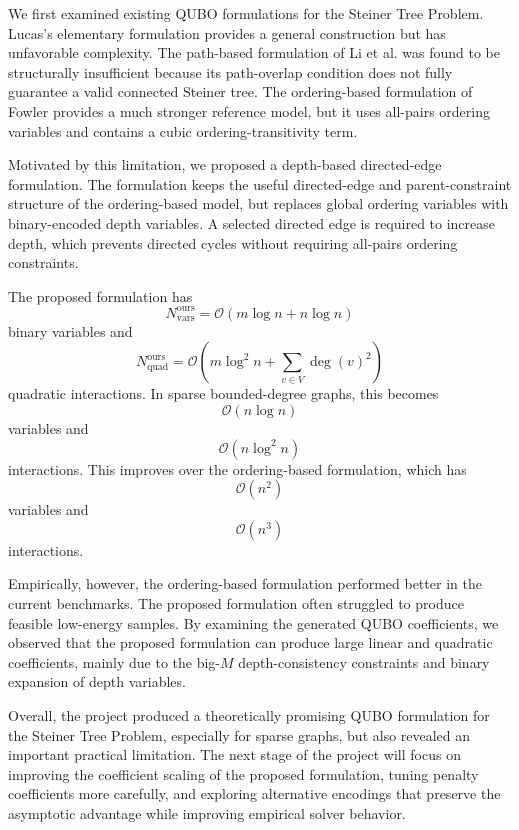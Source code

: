 \documentclass[a4paper,12pt]{report}
\begin{document}
We first examined existing QUBO formulations for the Steiner Tree Problem. Lucas's elementary formulation provides a general construction but has unfavorable complexity. The path-based formulation of Li et al. was found to be structurally insufficient because its path-overlap condition does not fully guarantee a valid connected Steiner tree. The ordering-based formulation of Fowler provides a much stronger reference model, but it uses all-pairs ordering variables and contains a cubic ordering-transitivity term.

Motivated by this limitation, we proposed a depth-based directed-edge formulation. The formulation keeps the useful directed-edge and parent-constraint structure of the ordering-based model, but replaces global ordering variables with binary-encoded depth variables. A selected directed edge is required to increase depth, which prevents directed cycles without requiring all-pairs ordering constraints.

The proposed formulation has
\[
N_{\text{vars}}^{\text{ours}}
=
\mathcal{O}(m\log n+n\log n)
\]
binary variables and
\[
N_{\text{quad}}^{\text{ours}}
=
\mathcal{O}
\left(
m\log^2 n+\sum_{v\in V}\deg(v)^2
\right)
\]
quadratic interactions. In sparse bounded-degree graphs, this becomes
\[
\mathcal{O}(n\log n)
\]
variables and
\[
\mathcal{O}(n\log^2 n)
\]
interactions. This improves over the ordering-based formulation, which has
\[
\mathcal{O}(n^2)
\]
variables and
\[
\mathcal{O}(n^3)
\]
interactions.

Empirically, however, the ordering-based formulation performed better in the current benchmarks. The proposed formulation often struggled to produce feasible low-energy samples. By examining the generated QUBO coefficients, we observed that the proposed formulation can produce large linear and quadratic coefficients, mainly due to the big-\(M\) depth-consistency constraints and binary expansion of depth variables.

Overall, the project produced a theoretically promising QUBO formulation for the Steiner Tree Problem, especially for sparse graphs, but also revealed an important practical limitation. The next stage of the project will focus on improving the coefficient scaling of the proposed formulation, tuning penalty coefficients more carefully, and exploring alternative encodings that preserve the asymptotic advantage while improving empirical solver behavior.



\end{document}
